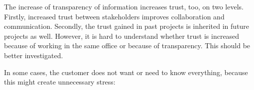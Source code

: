 %
% 
%
%
%

 The increase of transparency of information increases trust, too, on two levels. Firstly, increased trust between stakeholders improves collaboration and communication. Secondly, the trust gained in past projects %
is inherited %
in future projects as well. However, it is hard to understand whether trust is increased because of working in the same office or because of transparency. This should be better investigated. %

 In some cases, the customer does not want or need to know everything, because this might create unnecessary stress: %

